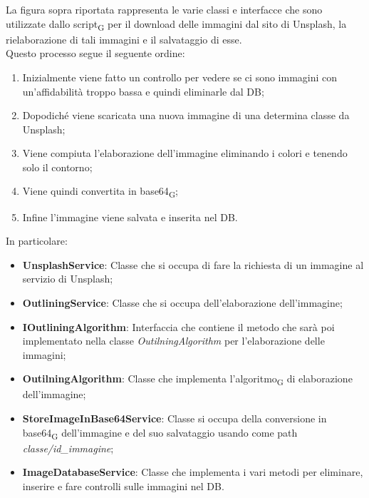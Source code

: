La figura sopra riportata rappresenta le varie classi e interfacce che sono utilizzate dallo script\textsubscript{G} per il download delle immagini dal sito di Unsplash, la rielaborazione di tali immagini e il salvataggio di esse.\\ Questo processo segue il seguente ordine:
\begin{enumerate}
	\item Inizialmente viene fatto un controllo per vedere se ci sono immagini con un'affidabilità troppo bassa e quindi eliminarle dal DB;
    \item Dopodiché viene scaricata una nuova immagine di una determina classe da Unsplash;
    \item Viene compiuta l'elaborazione dell'immagine eliminando i colori e tenendo solo il contorno;
    \item Viene quindi convertita in base64\textsubscript{G};
    \item Infine l'immagine viene salvata e inserita nel DB.
\end{enumerate}
\newpage
In particolare:
\begin{itemize}
    \item \textbf{UnsplashService}: Classe che si occupa di fare la richiesta di un immagine al servizio di Unsplash;
    \item \textbf{OutliningService}: Classe che si occupa dell'elaborazione dell'immagine;
    \item \textbf{IOutliningAlgorithm}: Interfaccia che contiene il metodo che sarà poi implementato nella classe \textit{OutilningAlgorithm} per l'elaborazione delle immagini;
    \item \textbf{OutilningAlgorithm}: Classe che implementa l'algoritmo\textsubscript{G} di elaborazione dell'immagine;
    \item \textbf{StoreImageInBase64Service}: Classe si occupa della conversione in base64\textsubscript{G} dell'immagine e del suo salvataggio usando come path \textit{classe/id\_immagine};
    \item \textbf{ImageDatabaseService}: Classe che implementa i vari metodi per eliminare, inserire e fare controlli sulle immagini nel DB.
\end{itemize}
\newpage
